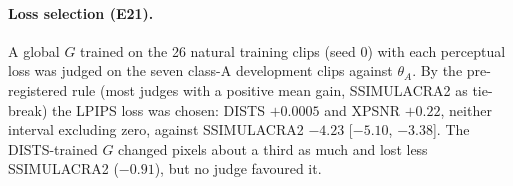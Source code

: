 \begin{table}[t]
  \centering
  \small
  \caption{E20: sharpening-only configurations versus tier-only on the training and development
  clips of each class (mean [95\,\% CI]).}
  \label{tab:e20}
  \setlength{\tabcolsep}{3pt}
\end{table}

\paragraph{Loss selection (E21).}
A global $G$ trained on the 26 natural training clips (seed 0) with each perceptual loss was judged
on the seven class-A development clips against $\theta_A$. By the pre-registered rule (most judges
with a positive mean gain, SSIMULACRA2 as tie-break) the LPIPS loss was chosen: DISTS
$+0.0005$ and XPSNR $+0.22$, neither interval excluding zero, against SSIMULACRA2 $-4.23$
[$-5.10$, $-3.38$]. The DISTS-trained $G$ changed pixels about a third as much and lost less
SSIMULACRA2 ($-0.91$), but no judge favoured it.

